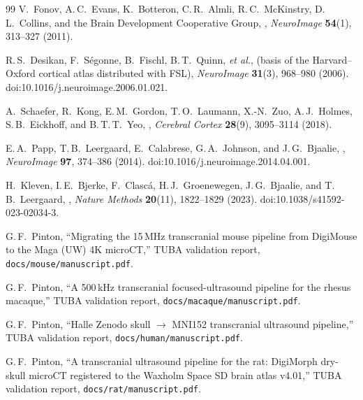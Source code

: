\documentclass{compactarticle}
\begin{document}
\begin{thebibliography}{99}
 V.~Fonov, A.\,C.~Evans, K.~Botteron,
  C.\,R.~Almli, R.\,C.~McKinstry, D.\,L.~Collins, and the
  Brain Development Cooperative Group,
  ,
  \emph{NeuroImage} {\bf 54}(1), 313--327 (2011).

 R.\,S.~Desikan, F.~S\'egonne, B.~Fischl,
  B.\,T.~Quinn, \emph{et al.},
   (basis of the
  Harvard--Oxford cortical atlas distributed with FSL),
  \emph{NeuroImage} {\bf 31}(3), 968--980 (2006).
  doi:10.1016/j.neuroimage.2006.01.021.

 A.~Schaefer, R.~Kong, E.\,M.~Gordon,
  T.\,O.~Laumann, X.-N.~Zuo, A.\,J.~Holmes, S.\,B.~Eickhoff, and
  B.\,T.\,T.~Yeo,
  ,
  \emph{Cerebral Cortex} {\bf 28}(9), 3095--3114 (2018).

 E.\,A.~Papp, T.\,B.~Leergaard, E.~Calabrese,
  G.\,A.~Johnson, and J.\,G.~Bjaalie,
  ,
  \emph{NeuroImage} {\bf 97}, 374--386 (2014).
  doi:10.1016/j.neuroimage.2014.04.001.

 H.~Kleven, I.\,E.~Bjerke, F.~Clasc\'a,
  H.\,J.~Groenewegen, J.\,G.~Bjaalie, and T.\,B.~Leergaard,
  ,
  \emph{Nature Methods} {\bf 20}(11), 1822--1829 (2023).
  doi:10.1038/s41592-023-02034-3.

 G.\,F.~Pinton,
  ``Migrating the 15\,MHz transcranial mouse pipeline from
  DigiMouse to the Maga (UW) 4K microCT,''
  TUBA validation report, \texttt{docs/mouse/manuscript.pdf}.

 G.\,F.~Pinton,
  ``A 500\,kHz transcranial focused-ultrasound pipeline for the
  rhesus macaque,''
  TUBA validation report, \texttt{docs/macaque/manuscript.pdf}.

 G.\,F.~Pinton,
  ``Halle Zenodo skull $\to$ MNI152 transcranial ultrasound
  pipeline,''
  TUBA validation report, \texttt{docs/human/manuscript.pdf}.

 G.\,F.~Pinton,
  ``A transcranial ultrasound pipeline for the rat: DigiMorph
  dry-skull microCT registered to the Waxholm Space SD brain
  atlas v4.01,''
  TUBA validation report, \texttt{docs/rat/manuscript.pdf}.

\end{thebibliography}
\end{document}
